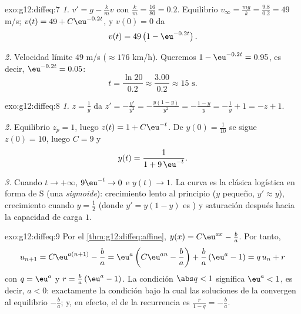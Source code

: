 \begin{solution}{exo:g12:diffeq:7}
\emph{1.} $v' = g - \frac{k}{m} v$ con $\frac km = \frac{16}{80} = 0.2$.
Equilibrio $v_\infty = \frac{mg}{k} = \frac{9.8}{0.2} = 49$ m/s;
$v(t) = 49 + C\eu^{-0.2t}$, y $v(0) = 0$ da
\[
v(t) = 49\left(1 - \eu^{-0.2 t}\right).
\]

\emph{2.} Velocidad límite $49$ m/s ($\approx 176$ km/h). Queremos
$1 - \eu^{-0.2t} = 0.95$, es decir, $\eu^{-0.2t} = 0.05$:
\[
t = \frac{\ln 20}{0.2} \approx \frac{3.00}{0.2} \approx 15 \text{ s}.
\]
\end{solution}

\begin{solution}{exo:g12:diffeq:8}
\emph{1.} $z = \frac1y$ da $z' = -\frac{y'}{y^2}
= -\frac{y(1-y)}{y^2} = -\frac{1-y}{y} = -\frac1y + 1 = -z + 1$.

\emph{2.} Equilibrio $z_p = 1$, luego $z(t) = 1 + C\eu^{-t}$. De
$y(0) = \frac{1}{10}$ se sigue $z(0) = 10$, luego $C = 9$ y
\[
y(t) = \frac{1}{1 + 9\,\eu^{-t}} .
\]

\emph{3.} Cuando $t \to +\infty$, $9\eu^{-t} \to 0$ e $y(t) \to 1$. La
curva es la clásica logística en forma de S (una \emph{sigmoide}):
crecimiento lento al principio ($y$ pequeño, $y' \approx y$), crecimiento
 cuando $y = \frac12$ (donde $y' = y(1-y)$ es ) y saturación
después hacia la capacidad de carga $1$.
\end{solution}

\begin{solution}{exo:g12:diffeq:9}
Por el \cref{thm:g12:diffeq:affine}, $y(x) = C\eu^{ax} - \frac ba$. Por
tanto,
\[
u_{n+1} = C\eu^{a(n+1)} - \frac ba
= \eu^{a}\left(C\eu^{an} - \frac ba\right) + \frac ba\left(\eu^a - 1\right)
= q\,u_n + r
\]
con $q = \eu^{a}$ y $r = \frac{b}{a}\left(\eu^{a} - 1\right)$. La condición
$\abs q < 1$ significa $\eu^a < 1$, es decir, $a < 0$: exactamente la
condición bajo la cual las soluciones de la  convergen
al equilibrio $-\frac ba$; y, en efecto, el  de la recurrencia es
$\frac{r}{1 - q} = -\frac{b}{a}$.
\end{solution}


